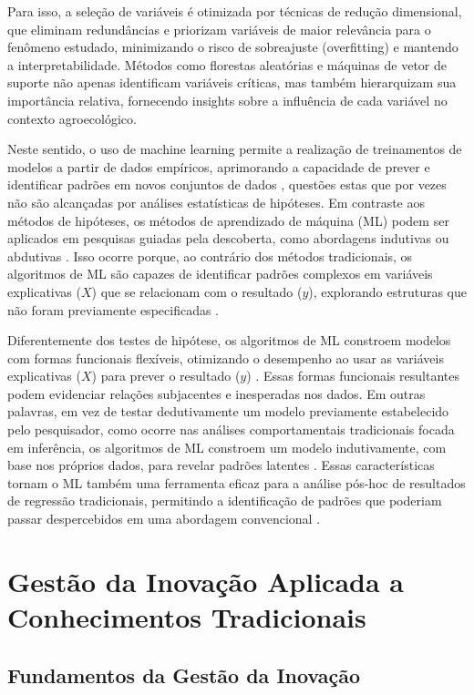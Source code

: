 Para isso, a seleção de variáveis é otimizada por técnicas de redução dimensional, que eliminam redundâncias e priorizam variáveis de maior relevância para o fenômeno estudado, minimizando o risco de sobreajuste (overfitting) e mantendo a interpretabilidade. Métodos como florestas aleatórias e máquinas de vetor de suporte não apenas identificam variáveis críticas, mas também hierarquizam sua importância relativa, fornecendo insights sobre a influência de cada variável no contexto agroecológico.

Neste sentido, o uso de machine learning permite a realização de treinamentos de modelos a partir de dados empíricos, aprimorando a capacidade de prever e identificar padrões em novos conjuntos de dados  \cite{Choudhury2021}, questões estas que por vezes não são alcançadas por análises estatísticas de hipóteses. 
Em contraste aos métodos de hipóteses, os métodos de aprendizado de máquina (ML) podem ser aplicados em pesquisas guiadas pela descoberta, como abordagens indutivas ou abdutivas \cite{Ritchie2016}. Isso ocorre porque, ao contrário dos métodos tradicionais, os algoritmos de ML são capazes de identificar padrões complexos em variáveis explicativas ($X$) que se relacionam com o resultado ($y$), explorando estruturas que não foram previamente especificadas \cite{Benos2021}. 

Diferentemente dos testes de hipótese, os algoritmos de ML constroem modelos com formas funcionais flexíveis, otimizando o desempenho ao usar as variáveis explicativas ($X$) para prever o resultado ($y$) \cite{Parish2016}. Essas formas funcionais resultantes podem evidenciar relações subjacentes e inesperadas nos dados.
Em outras palavras, em vez de testar dedutivamente um modelo previamente estabelecido pelo pesquisador, como ocorre nas análises comportamentais tradicionais focada em inferência, os algoritmos de ML constroem um modelo indutivamente, com base nos próprios dados, para revelar padrões latentes \cite{Candelieri2019}. Essas características tornam o ML também uma ferramenta eficaz para a análise pós-hoc de resultados de regressão tradicionais, permitindo a identificação de padrões que poderiam passar despercebidos em uma abordagem convencional \cite{vanVliet2020}.

\section{Gestão da Inovação Aplicada a Conhecimentos Tradicionais}

\subsection{Fundamentos da Gestão da Inovação}

